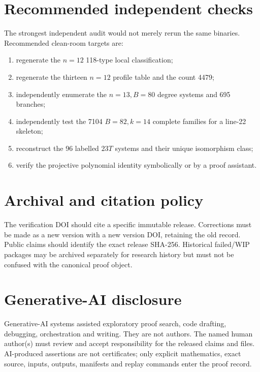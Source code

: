 \documentclass[11pt]{article}
\begin{document}
\section{Recommended independent checks}

The strongest independent audit would not merely rerun the same binaries.  Recommended clean-room targets are:
\begin{enumerate}
\item regenerate the $n=12$ 118-type local classification;
\item regenerate the thirteen $n=12$ profile table and the count 4479;
\item independently enumerate the $n=13,B=80$ degree systems and 695 branches;
\item independently test the 7104 $B=82,k=14$ complete families for a line-22 skeleton;
\item reconstruct the 96 labelled $23T$ systems and their unique isomorphism class;
\item verify the projective polynomial identity symbolically or by a proof assistant.
\end{enumerate}

\section{Archival and citation policy}

The verification DOI should cite a specific immutable release.  Corrections must be made as a new version with a new version DOI, retaining the old record.  Public claims should identify the exact release SHA-256.  Historical failed/WIP packages may be archived separately for research history but must not be confused with the canonical proof object.

\section{Generative-AI disclosure}

Generative-AI systems assisted exploratory proof search, code drafting, debugging, orchestration and writing.  They are not authors.  The named human author(s) must review and accept responsibility for the released claims and files.  AI-produced assertions are not certificates; only explicit mathematics, exact source, inputs, outputs, manifests and replay commands enter the proof record.
\end{document}
